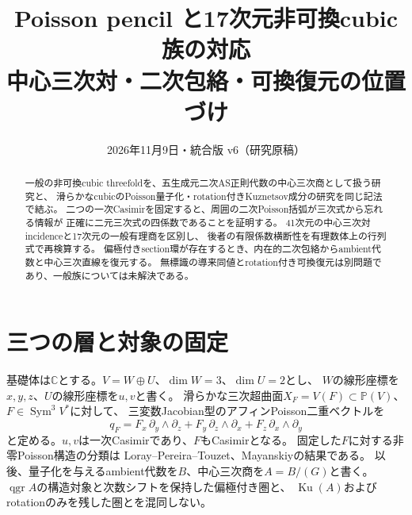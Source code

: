 \documentclass[a4paper,11pt]{ltjsarticle}
\title{Poisson pencil と17次元非可換cubic族の対応\\\large 中心三次対・二次包絡・可換復元の位置づけ}
\author{}
\date{2026年11月9日・統合版 v6（研究原稿）}
\newcommand{\CC}{\mathbb C}
\newcommand{\PP}{\mathbb P}
\newcommand{\Sym}{\operatorname{Sym}}
\newcommand{\qgr}{\operatorname{qgr}}
\newcommand{\Ku}{\operatorname{Ku}}
\theoremstyle{remark}
\begin{document}
\maketitle
\begin{abstract}
一般の非可換cubic threefoldを、五生成元二次AS正則代数の中心三次商として扱う研究と、
滑らかなcubicのPoisson量子化・rotation付きKuznetsov成分の研究を同じ記法で結ぶ。
二つの一次Casimirを固定すると、周囲の二次Poisson括弧が三次式から忘れる情報が
正確に二元三次式の四係数であることを証明する。
41次元の中心三次対incidenceと17次元の一般有理商を区別し、
後者の有限係数横断性を有理数体上の行列式で再検算する。
偏極付きsection環が存在するとき、内在的二次包絡からambient代数と中心三次直線を復元する。
無標識の導来同値とrotation付き可換復元は別問題であり、一般族については未解決である。
\end{abstract}

\section{三つの層と対象の固定}
基礎体は$\CC$とする。$V=W\oplus U$、$\dim W=3$、$\dim U=2$とし、
$W$の線形座標を$x,y,z$、$U$の線形座標を$u,v$と書く。
滑らかな三次超曲面$X_F=V(F)\subset\PP(V)$、$F\in\Sym^3V^*$に対して、
三変数Jacobian型のアフィンPoisson二重ベクトルを
\begin{equation}\label{eq:poisson}
q_F=F_x\,\partial_y\wedge\partial_z
    +F_y\,\partial_z\wedge\partial_x
    +F_z\,\partial_x\wedge\partial_y
\end{equation}
と定める。$u,v$は一次Casimirであり、$F$もCasimirとなる。
固定した$F$に対する非零Poisson構造の分類は
Loray--Pereira--Touzet、Mayanskiyの結果である\cite{LPT,May}。
以後、量子化を与えるambient代数を$B$、中心三次商を$A=B/(G)$と書く。
$\qgr A$の構造対象と次数シフトを保持した偏極付き圏と、
$\Ku(A)$およびrotationのみを残した圏とを混同しない。
\end{document}
